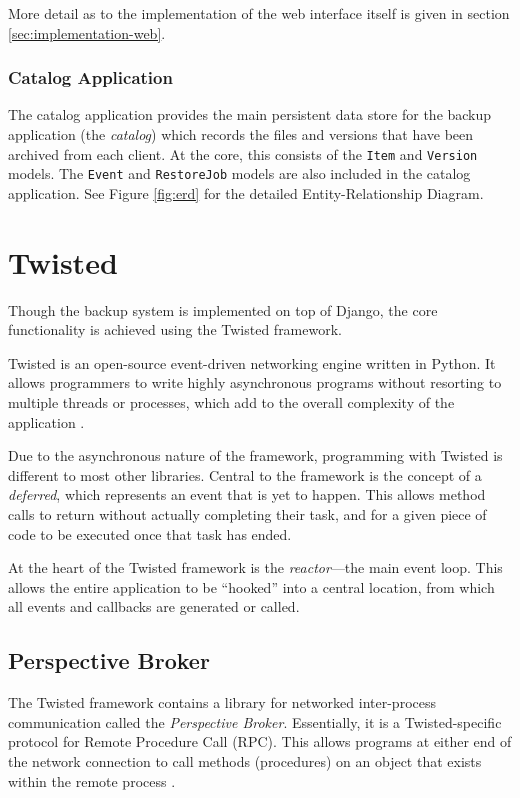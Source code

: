 More detail as to the implementation of the web interface itself is given in
section \ref{sec:implementation-web}.

\subsubsection{Catalog Application}
\label{sec:implementation-django-structure-catalog}

The catalog application provides the main persistent data store for the backup
application (the \emph{catalog}) which records the files and versions that have
been archived from each client. At the core, this consists of the \verb!Item!
and \verb!Version! models. The \verb!Event! and \verb!RestoreJob! models are
also included in the catalog application. See Figure \ref{fig:erd} for the
detailed Entity-Relationship Diagram.

\section{Twisted}
\label{sec:implementation-twisted}

Though the backup system is implemented on top of Django, the core
functionality is achieved using the Twisted framework.

Twisted is an open-source event-driven networking engine written in Python. It
allows programmers to write highly asynchronous programs without resorting to
multiple threads or processes, which add to the overall complexity of the
application \cite{kinder2005}.

Due to the asynchronous nature of the framework, programming with Twisted is
different to most other libraries. Central to the framework is the concept of
a \emph{deferred}, which represents an event that is yet to happen. This allows
method calls to return without actually completing their task, and for a given
piece of code to be executed once that task has ended.

At the heart of the Twisted framework is the \emph{reactor}---the main event
loop. This allows the entire application to be ``hooked'' into a central
location, from which all events and callbacks are generated or called.

\subsection{Perspective Broker}
\label{sec:implementation-twisted-pb}

The Twisted framework contains a library for networked inter-process
communication called the \emph{Perspective Broker}. Essentially, it is
a Twisted-specific protocol for Remote Procedure Call (RPC). This allows
programs at either end of the network connection to call methods (procedures)
on an object that exists within the remote process \cite{lefkowitz2003}.

